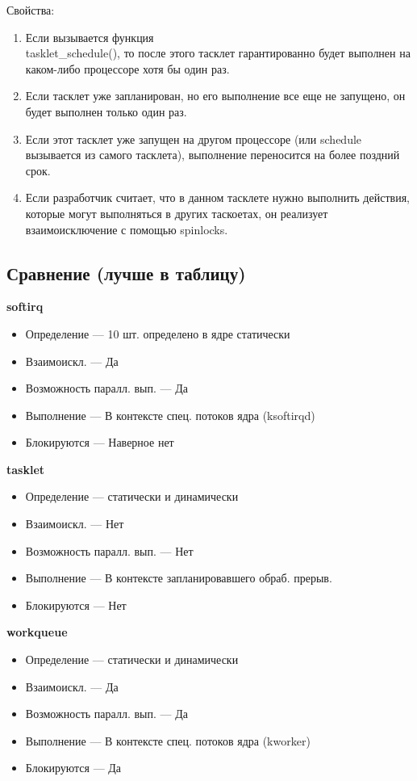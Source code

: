 Свойства:
\begin{enumerate}
	\item Если вызывается функция \\ tasklet\_schedule(), то после этого тасклет гарантированно будет выполнен на каком-либо процессоре хотя бы один раз. 
	\item Если тасклет уже запланирован, но его выполнение все еще не запущено, он будет выполнен только один раз. 
	\item Если этот тасклет уже запущен на другом процессоре (или schedule вызывается из самого тасклета), выполнение переносится на более поздний срок. 
	\item Если разработчик считает, что в данном тасклете нужно выполнить действия, которые могут выполняться в других таскоетах, он реализует взаимоисключение с помощью spinlocks.
\end{enumerate}

\subsection*{Сравнение (лучше в таблицу)}
\textbf{softirq}
\begin{itemize}
	\item Определение --- 10 шт. определено в ядре статически
	\item Взаимоискл. --- Да
	\item Возможность паралл. вып. --- Да
	\item Выполнение --- В контексте спец. потоков ядра (ksoftirqd)
	\item Блокируются --- Наверное нет
\end{itemize}

\textbf{tasklet}
\begin{itemize}
	\item Определение --- статически и динамически
	\item Взаимоискл. --- Нет
	\item Возможность паралл. вып. --- Нет
	\item Выполнение --- В контексте запланировавшего обраб. прерыв.
	\item Блокируются --- Нет
\end{itemize}

\textbf{workqueue}
\begin{itemize}
	\item Определение --- статически и динамически
	\item Взаимоискл. --- Да
	\item Возможность паралл. вып. --- Да
	\item Выполнение --- В контексте спец. потоков ядра (kworker)
	\item Блокируются --- Да
\end{itemize}

